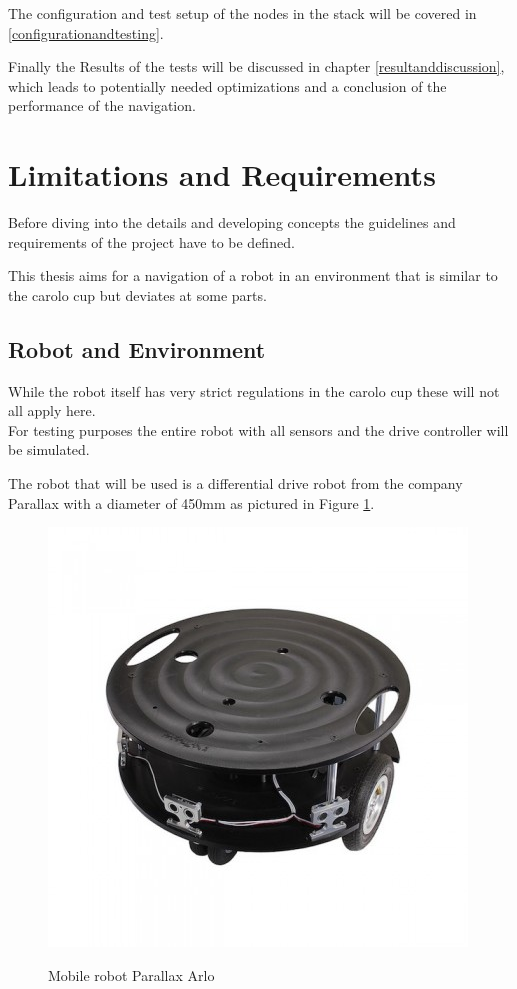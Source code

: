 The configuration and test setup of the nodes in the stack will be covered in \ref{configurationandtesting}.


Finally the Results of the tests will be discussed in chapter \ref{resultanddiscussion}, which leads to potentially needed optimizations and a conclusion of the performance of the navigation.

\section{Limitations and Requirements}

Before diving into the details and developing concepts the guidelines and requirements of the project have to be defined.

This thesis aims for a navigation of a robot in an environment that is similar to the carolo cup but deviates at some parts.

\subsection{Robot and Environment}
While the robot itself has very strict regulations in the carolo cup these will not all apply here.\\

For testing purposes the entire robot with all sensors and the drive controller will be simulated.

The robot that will be used is a differential drive robot from the company Parallax with a diameter of 450mm as pictured in Figure \ref{arloreal}.\\

\begin{figure}
	\centering
	\includegraphics[width=.7\textwidth]{arlo real}
	\label{arloreal}
	\caption{Mobile robot Parallax Arlo}
\end{figure}

